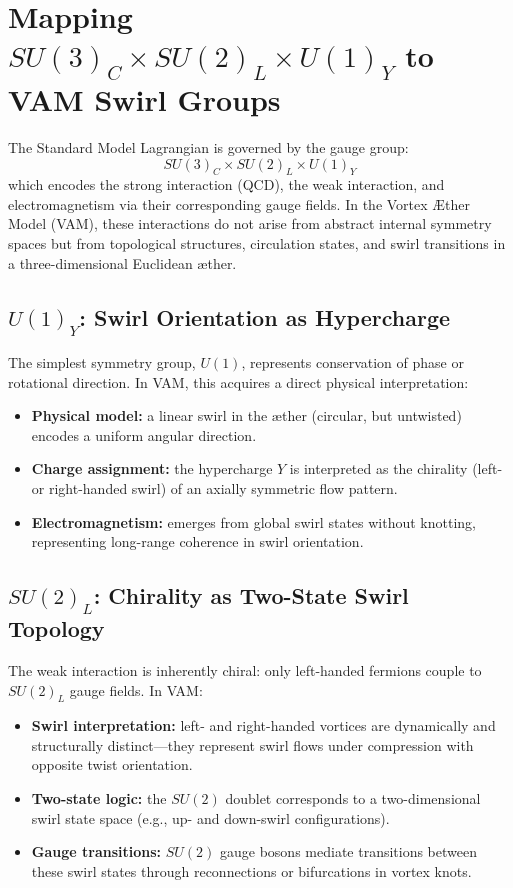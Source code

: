 \section{Mapping \texorpdfstring{$SU(3)_C \times SU(2)_L \times U(1)_Y$}{SU(3) x SU(2) x U(1)} to VAM Swirl Groups}

The Standard Model Lagrangian is governed by the gauge group:
\[
    SU(3)_C \times SU(2)_L \times U(1)_Y
\]
which encodes the strong interaction (QCD), the weak interaction, and electromagnetism via their corresponding gauge fields. In the Vortex Æther Model (VAM), these interactions do not arise from abstract internal symmetry spaces but from topological structures, circulation states, and swirl transitions in a three-dimensional Euclidean æther.

\subsection{$U(1)_Y$: Swirl Orientation as Hypercharge}

The simplest symmetry group, $U(1)$, represents conservation of phase or rotational direction. In VAM, this acquires a direct physical interpretation:
\begin{itemize}
    \item \textbf{Physical model:} a linear swirl in the æther (circular, but untwisted) encodes a uniform angular direction.
    \item \textbf{Charge assignment:} the hypercharge $Y$ is interpreted as the chirality (left- or right-handed swirl) of an axially symmetric flow pattern.
    \item \textbf{Electromagnetism:} emerges from global swirl states without knotting, representing long-range coherence in swirl orientation.
\end{itemize}

\subsection{$SU(2)_L$: Chirality as Two-State Swirl Topology}

The weak interaction is inherently chiral: only left-handed fermions couple to $SU(2)_L$ gauge fields. In VAM:
\begin{itemize}
    \item \textbf{Swirl interpretation:} left- and right-handed vortices are dynamically and structurally distinct—they represent swirl flows under compression with opposite twist orientation.
    \item \textbf{Two-state logic:} the $SU(2)$ doublet corresponds to a two-dimensional swirl state space (e.g., up- and down-swirl configurations).
    \item \textbf{Gauge transitions:} $SU(2)$ gauge bosons mediate transitions between these swirl states through reconnections or bifurcations in vortex knots.
\end{itemize}

